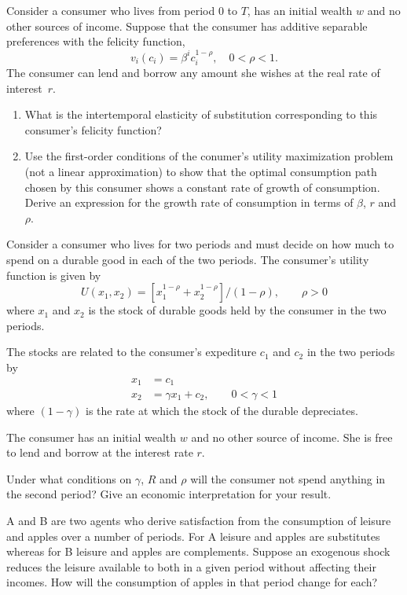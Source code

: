 \documentclass[11pt,reqno,openany]{amsbook}
\begin{document}
\begin{exercises}
  \item Consider a consumer who lives from period $0$ to $T$,
  has an initial wealth $w$ and no other sources of income. Suppose
  that the consumer has additive separable preferences with the
  felicity function,
  \[v_i(c_i)=\beta^i c_i^{1-\rho},\quad 0<\rho<1.\]
  The consumer can lend and borrow any amount she wishes at the real
  rate of interest~$r$.
  \begin{enumerate}
    \item What is the intertemporal elasticity of substitution
    corresponding to this consumer's felicity function?
    
    \item Use the first-order conditions of the conumer's utility
    maximization problem (not a linear approximation) to show that the
    optimal consumption path chosen by this consumer shows a constant
    rate of growth of consumption. Derive an expression for the growth
    rate of consumption in terms of $\beta$, $r$ and~$\rho$.
  \end{enumerate}

  \item Consider a consumer who lives for two periods and must
  decide on how much to spend on a durable good in each of the two
  periods. The consumer's utility function is given by
  \[U(x_1,x_2)=[x_1^{1-\rho}+x_2^{1-\rho}]/(1-\rho),\qquad \rho>0\]
  where $x_1$ and $x_2$ is the stock of durable goods held by the
  consumer in the two periods. 

  The stocks are related to the
  consumer's expediture $c_1$ and $c_2$ in the two periods by
  \begin{align*}
    x_1&=c_1\\
    x_2&=\gamma x_1+c_2,\qquad{0<\gamma<1}
  \end{align*}
  where $(1-\gamma)$ is the rate at which the stock of the
  durable depreciates.

  The consumer has an initial wealth $w$ and no other source
  of income. She is free to lend and borrow at the interest
  rate $r$.

  Under what conditions on $\gamma$, $R$ and $\rho$ will the consumer
  not spend anything in the second period? Give an economic
  interpretation for your result.

\item A and B are two agents who derive satisfaction from
  the consumption of leisure and apples over a number of
  periods. For A leisure and apples are substitutes whereas
  for B leisure and apples are complements. Suppose an
  exogenous shock reduces the leisure available to both in a
  given period without affecting their incomes. How will the
  consumption of apples in that period change for each?


\end{exercises}
\end{document}
